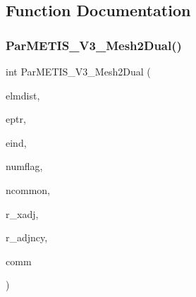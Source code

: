 \subsection{Function Documentation}
\mbox{\label{a00930_ab2b3727a0cfbdf8b75768c33487fa9f4}} 
\subsubsection{\texorpdfstring{Par\+M\+E\+T\+I\+S\+\_\+\+V3\+\_\+\+Mesh2\+Dual()}{ParMETIS\_V3\_Mesh2Dual()}}
{\footnotesize\ttfamily int Par\+M\+E\+T\+I\+S\+\_\+\+V3\+\_\+\+Mesh2\+Dual (\begin{DoxyParamCaption}\item[{\hyperlink{a00876_aaa5262be3e700770163401acb0150f52}{idx\+\_\+t} $\ast$}]{elmdist,  }\item[{\hyperlink{a00876_aaa5262be3e700770163401acb0150f52}{idx\+\_\+t} $\ast$}]{eptr,  }\item[{\hyperlink{a00876_aaa5262be3e700770163401acb0150f52}{idx\+\_\+t} $\ast$}]{eind,  }\item[{\hyperlink{a00876_aaa5262be3e700770163401acb0150f52}{idx\+\_\+t} $\ast$}]{numflag,  }\item[{\hyperlink{a00876_aaa5262be3e700770163401acb0150f52}{idx\+\_\+t} $\ast$}]{ncommon,  }\item[{\hyperlink{a00876_aaa5262be3e700770163401acb0150f52}{idx\+\_\+t} $\ast$$\ast$}]{r\+\_\+xadj,  }\item[{\hyperlink{a00876_aaa5262be3e700770163401acb0150f52}{idx\+\_\+t} $\ast$$\ast$}]{r\+\_\+adjncy,  }\item[{M\+P\+I\+\_\+\+Comm $\ast$}]{comm }\end{DoxyParamCaption})}

